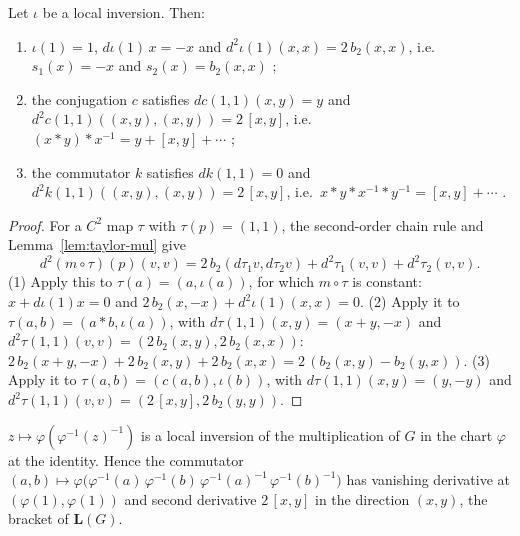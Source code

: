 \begin{theorem}
  \label{thm:taylor-inverse}
  \leanok
  Let $\iota$ be a local inversion. Then:
  \begin{enumerate}
    \item $\iota(1) = 1$, $d\iota(1)\,x = -x$ and $d^2\iota(1)(x, x) = 2\,b_2(x, x)$, i.e.\
      $s_1(x) = -x$ and $s_2(x) = b_2(x, x)$ \cite[(5.6)]{GN26};
    \item the conjugation $c$ satisfies $dc(1, 1)(x, y) = y$ and
      $d^2 c(1, 1)((x, y), (x, y)) = 2\,[x, y]$, i.e.\
      $(x * y) * x^{-1} = y + [x, y] + \cdots$ \cite[(5.7)]{GN26};
    \item the commutator $k$ satisfies $dk(1, 1) = 0$ and
      $d^2 k(1, 1)((x, y), (x, y)) = 2\,[x, y]$, i.e.\
      $x * y * x^{-1} * y^{-1} = [x, y] + \cdots$ \cite[(5.8)]{GN26}.
  \end{enumerate}
\end{theorem}

\begin{proof}
  \leanok
  For a $C^2$ map $\tau$ with $\tau(p) = (1, 1)$, the second-order chain rule and
  Lemma~\ref{lem:taylor-mul} give
  \[
    d^2(m \circ \tau)(p)(v, v) = 2\,b_2(d\tau_1 v, d\tau_2 v) + d^2\tau_1(v, v) + d^2\tau_2(v, v) .
  \]
  (1) Apply this to $\tau(a) = (a, \iota(a))$, for which $m \circ \tau$ is constant:
  $x + d\iota(1)x = 0$ and $2\,b_2(x, -x) + d^2\iota(1)(x, x) = 0$. (2) Apply it to
  $\tau(a, b) = (a * b, \iota(a))$, with $d\tau(1,1)(x, y) = (x + y, -x)$ and
  $d^2\tau(1, 1)(v, v) = (2\,b_2(x, y), 2\,b_2(x, x))$:
  $2\,b_2(x + y, -x) + 2\,b_2(x, y) + 2\,b_2(x, x) = 2\,(b_2(x, y) - b_2(y, x))$. (3) Apply it to
  $\tau(a, b) = (c(a, b), \iota(b))$, with $d\tau(1, 1)(x, y) = (y, -y)$ and
  $d^2\tau(1, 1)(v, v) = (2\,[x, y], 2\,b_2(y, y))$.
\end{proof}

\begin{corollary}
  \label{cor:lie-commutator}
  \leanok
  \uses{thm:taylor-inverse, def:lie-algebra}
  $z \mapsto \varphi(\varphi^{-1}(z)^{-1})$ is a local inversion of the multiplication of $G$
  in the chart $\varphi$ at the identity. Hence the commutator
  $(a, b) \mapsto \varphi\bigl(\varphi^{-1}(a)\,\varphi^{-1}(b)\,\varphi^{-1}(a)^{-1}\,
  \varphi^{-1}(b)^{-1}\bigr)$ has vanishing derivative at $(\varphi(1), \varphi(1))$ and second
  derivative $2\,[x, y]$ in the direction $(x, y)$, the bracket of $\mathbf{L}(G)$.
\end{corollary}

